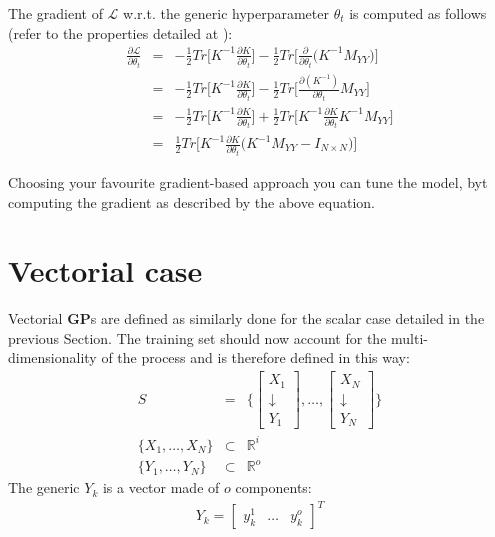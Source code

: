\documentclass{article}
\begin{document}
The gradient of $\mathcal{L}$ w.r.t. the generic hyperparameter $\theta_t$ is computed as follows (refer to the properties detailed at \cite{CookBook}):
\begin{eqnarray}
\frac{\partial \mathcal{L}}{\partial \theta_t} &=& 
-\frac{1}{2} Tr \bigg [ K^{-1} \frac{\partial K}{\partial \theta_t} \bigg ]
-\frac{1}{2} Tr \bigg [ \frac{\partial }{\partial \theta_t} \big (  
K^{-1} M_{YY}
\big ) \bigg ] \\
&=& -\frac{1}{2} Tr \bigg [ K^{-1} \frac{\partial K}{\partial \theta_t} \bigg ]
-\frac{1}{2} Tr \bigg [ \frac{\partial (K^{-1}) }{\partial \theta_t} M_{YY} \bigg ] \\
&=& -\frac{1}{2} Tr \bigg [ K^{-1} \frac{\partial K}{\partial \theta_t} \bigg ]
+\frac{1}{2} Tr \bigg [ K^{-1} \frac{\partial K}{\partial \theta_t} K^{-1} M_{YY} \bigg ] \\
&=&
\frac{1}{2} Tr \bigg [ K^{-1} \frac{\partial K}{\partial \theta_t} \bigg (K^{-1} M_{YY} - I_{N \times N} \bigg ) \bigg ]
 \label{eq:L_grad}
\end{eqnarray}

Choosing your favourite gradient-based approach you can tune the model, byt computing the gradient as described by the above equation.

\section{Vectorial case}
\label{sec:vectorial}

Vectorial \textbf{GP}s are defined as similarly done for the scalar case detailed in the previous Section.
The training set should now account for the multi-dimensionality of the process and is therefore defined in this way:
\begin{eqnarray}
S &=& 
\bigg \lbrace 
\begin{bmatrix} X_1 \\ \downarrow \\ Y_1 \end{bmatrix}, 
\hdots,  
\begin{bmatrix} X_N \\ \downarrow \\ Y_N \end{bmatrix}
\bigg \rbrace \\
\big \lbrace X_1, \hdots, X_N \big \rbrace &\subset & \mathbb{R}^i \\
\big \lbrace Y_1, \hdots, Y_N \big \rbrace &\subset & \mathbb{R}^o
\end{eqnarray}
The generic $Y_k$ is a vector made of $o$ components:
\begin{eqnarray}
Y_k = \begin{bmatrix} y_k^1 & \hdots & y_k^o \end{bmatrix}^T
\end{eqnarray}
\end{document}

